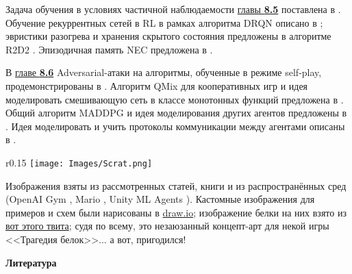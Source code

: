 Задача обучения в условиях частичной наблюдаемости \underline{главы \textbf{8.5}}  поставлена в \cite{smallwood1973optimal}. Обучение рекуррентных сетей в RL в рамках алгоритма DRQN описано в \cite{hausknecht2015deep}; эвристики разогрева и хранения скрытого состояния предложены в алгоритме R2D2 \cite{horgan2018distributed}. Эпизодичная память NEC предложена в \cite{pritzel2017neural}.

В \underline{главе \textbf{8.6}} Adversarial-атаки на алгоритмы, обученные в режиме self-play, продемонстрированы в \cite{gleave2019adversarial}. Алгоритм QMix для кооперативных игр и идея моделировать смешивающую сеть в классе монотонных функций предложена в \cite{rashid2018qmix}. Общий алгоритм MADDPG и идея моделирования других агентов предложены в \cite{lowe2017multi}. Идея моделировать и учить протоколы коммуникации между агентами описаны в \cite{foerster2016learning}.

\begin{wrapfigure}{r}{0.15\textwidth}
\vspace{-0.5cm}
\centering
\texttt{[image: Images/Scrat.png]}
\vspace{-0.8cm}
\end{wrapfigure}

Изображения взяты из рассмотренных статей, книги \cite{sutton2018reinforcement} и из распространённых сред (OpenAI Gym \cite{brockman2016openai}, Mario \cite{gym-super-mario-bros}, Unity ML Agents \cite{juliani2018unity}). Кастомные изображения для примеров и схем были нарисованы в \href{https://www.draw.io/}{draw.io}; изображение белки на них взято из \href{https://twitter.com/racefornuts/status/690043558208913408}{вот этого твита}; судя по всему, это незаюзанный концепт-арт для некой игры <<Трагедия белок>>... а вот, пригодился!

\newpage
\huge \textbf{\textcolor{ChadBlue}{Литература}}
\normalsize
